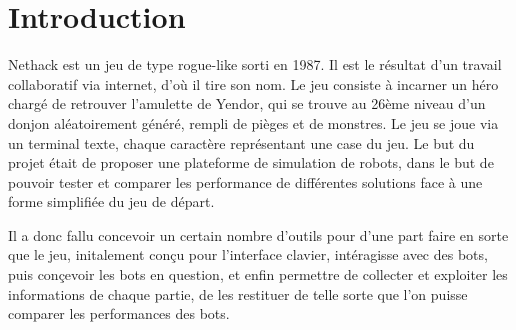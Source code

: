 \chapter*{Introduction}

Nethack est un jeu de type rogue-like sorti en 1987. Il est le résultat d'un travail collaboratif via internet, d'où il tire son nom. Le jeu consiste à incarner un héro chargé de retrouver l'amulette de Yendor, qui se trouve au 26ème niveau d'un donjon aléatoirement généré, rempli de pièges et de monstres. Le jeu se joue via un terminal texte, chaque caractère représentant une case du jeu. Le but du projet était de proposer une plateforme de simulation de robots, dans le but de pouvoir tester et comparer les performance de différentes solutions face à une forme simplifiée du jeu de départ. 

Il a donc fallu concevoir un certain nombre d'outils pour d'une part faire en sorte que le jeu, initalement conçu pour l'interface clavier, intéragisse avec des bots, puis conçevoir les bots en question, et enfin permettre de collecter et exploiter les informations de chaque partie, de les restituer de telle sorte que l'on puisse comparer les performances des bots.



